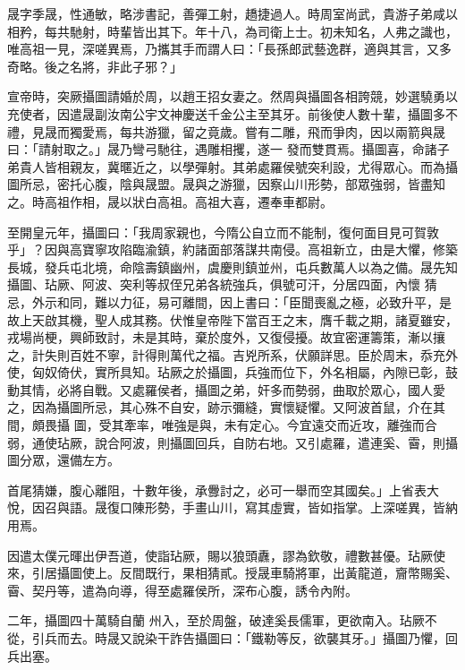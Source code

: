 \begin{pinyinscope}
 晟字季晟，性通敏，略涉書記，善彈工射，趫捷過人。時周室尚武，貴游子弟咸以相矜，每共馳射，時輩皆出其下。年十八，為司衛上士。初未知名，人弗之識也，唯高祖一見，深嗟異焉，乃攜其手而謂人曰：「長孫郎武藝逸群，適與其言，又多奇略。後之名將，非此子邪？」



 宣帝時，突厥攝圖請婚於周，以趙王招女妻之。然周與攝圖各相誇競，妙選驍勇以充使者，因遣晟副汝南公宇文神慶送千金公主至其牙。前後使人數十輩，攝圖多不禮，見晟而獨愛焉，每共游獵，留之竟歲。嘗有二雕，飛而爭肉，因以兩箭與晟曰：「請射取之。」晟乃彎弓馳往，遇雕相攫，遂一
 發而雙貫焉。攝圖喜，命諸子弟貴人皆相親友，冀暱近之，以學彈射。其弟處羅侯號突利設，尤得眾心。而為攝圖所忌，密托心腹，陰與晟盟。晟與之游獵，因察山川形勢，部眾強弱，皆盡知之。時高祖作相，晟以狀白高祖。高祖大喜，遷奉車都尉。



 至開皇元年，攝圖曰：「我周家親也，今隋公自立而不能制，復何面目見可賀敦乎」？因與高寶寧攻陷臨渝鎮，約諸面部落謀共南侵。高祖新立，由是大懼，修築長城，發兵屯北境，命陰壽鎮幽州，虞慶則鎮並州，屯兵數萬人以為之備。晟先知攝圖、玷厥、阿波、突利等叔侄兄弟各統強兵，俱號可汗，分居四面，內懷
 猜忌，外示和同，難以力征，易可離間，因上書曰：「臣聞喪亂之極，必致升平，是故上天啟其機，聖人成其務。伏惟皇帝陛下當百王之末，膺千載之期，諸夏雖安，戎場尚梗，興師致討，未是其時，棄於度外，又復侵擾。故宜密運籌策，漸以攘之，計失則百姓不寧，計得則萬代之福。吉兇所系，伏願詳思。臣於周末，忝充外使，匈奴倚伏，實所具知。玷厥之於攝圖，兵強而位下，外名相屬，內隙已彰，鼓動其情，必將自戰。又處羅侯者，攝圖之弟，奸多而勢弱，曲取於眾心，國人愛之，因為攝圖所忌，其心殊不自安，跡示彌縫，實懷疑懼。又阿波首鼠，介在其間，頗畏攝
 圖，受其牽率，唯強是與，未有定心。今宜遠交而近攻，離強而合弱，通使玷厥，說合阿波，則攝圖回兵，自防右地。又引處羅，遣連奚、霫，則攝圖分眾，還備左方。



 首尾猜嫌，腹心離阻，十數年後，承釁討之，必可一舉而空其國矣。」上省表大悅，因召與語。晟復口陳形勢，手畫山川，寫其虛實，皆如指掌。上深嗟異，皆納用焉。



 因遣太僕元暉出伊吾道，使詣玷厥，賜以狼頭纛，謬為欽敬，禮數甚優。玷厥使來，引居攝圖使上。反間既行，果相猜貳。授晟車騎將軍，出黃龍道，齎幣賜奚、霫、契丹等，遣為向導，得至處羅侯所，深布心腹，誘令內附。



 二年，攝圖四十萬騎自蘭
 州入，至於周盤，破達奚長儒軍，更欲南入。玷厥不從，引兵而去。時晟又說染干詐告攝圖曰：「鐵勒等反，欲襲其牙。」攝圖乃懼，回兵出塞。




\end{pinyinscope}

